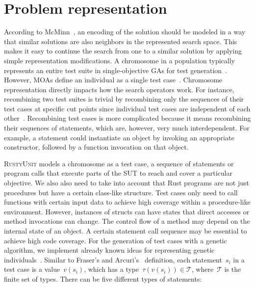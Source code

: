 \documentclass[paper=a4,%
  twoside,%
  BCOR4mm,%
  abstract=true,%
  toc=bibliography,%
  chapterprefix=true,%
  toc=bibliographynumbered,%
  open=right,%
  english,%
  pagesize=pdftex]{scrreprt}
\newcommand{\tech}{\textsc{RustyUnit}\xspace}
\newcommand{\sut}{\ac{SUT}\xspace}
\begin{document}
\section{Problem representation}
\label{sec:problem-representation}
According to McMinn~\cite{McMinn_2004}, an encoding of the solution should be modeled in a way that similar solutions are also neighbors in the represented search space. This makes it easy to continue the search from one to a similar solution by applying simple representation modifications. A chromosome in a population typically represents an entire test suite in single-objective \acp{GA} for test generation~\cite{Fraser_2011a, Campos2017}. However, \acp{MOA} define an individual as a single test case~\cite{Panichella2018}. Chromosome representation directly impacts how the search operators work. For instance, recombining two test suites is trivial by recombining only the sequences of their test cases at specific cut points since individual test cases are independent of each other~\cite{Fraser_2013}. Recombining test cases is more complicated because it means recombining their sequences of statements, which are, however, very much interdependent. For example, a statement could instantiate an object by invoking an appropriate constructor, followed by a function invocation on that object.

\tech models a chromosome as a test case, a sequence of statements or program calls that execute parts of the \sut to reach and cover a particular objective. We also also need to take into account that Rust programs are not just procedures but have a certain class-like structure. Test cases only need to call functions with certain input data to achieve high coverage within a procedure-like environment. However, instances of structs can have states that direct accesses or method invocations can change. The control flow of a method may depend on the internal state of an object. A certain statement call sequence may be essential to achieve high code coverage. For the generation of test cases with a genetic algorithm, we implement already known ideas for representing genetic individuals~\cite{Fraser2012,Tonella2004,Arcuri2008}. Similar to Fraser's and Arcuri's~\cite{Fraser_2011a} definition, each statement~$s_i$ in a test case is a value~$v(s_i)$, which has a type~$\tau(v(s_i)) \in \mathcal{T}$, where~$\mathcal{T}$ is the finite set of types. There can be five different types of statements:
\end{document}
